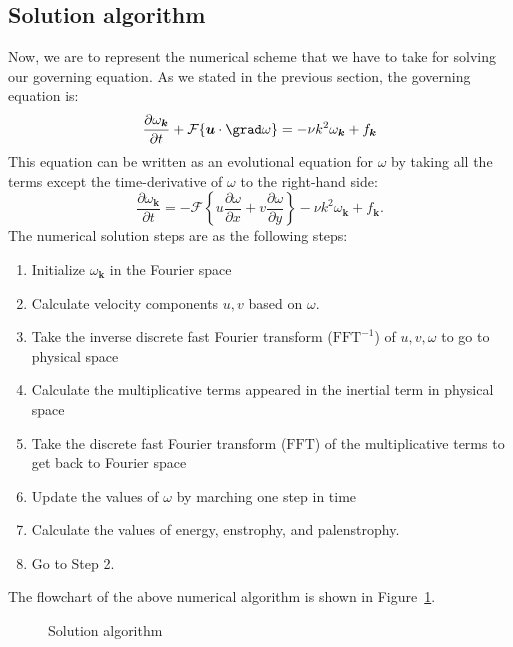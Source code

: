 \documentclass[12pt]{article}
\def\vk{\bm{k}}
\def\u{\bm{u}}
\begin{document}
\subsection{Solution algorithm}
Now, we are to represent the numerical scheme that we have to take for solving our governing equation. As we stated in the previous section, the governing equation is:
\begin{equation}\label{Eq-14}
\frac{\partial\omega_{\vk}}{\partial t} + \mathcal{F}\{\u\cdot\grad\omega\}= -\nu{k}^2\omega_{\vk} + f_{\vk}
\end{equation}
%
This equation can be written as an evolutional equation for $\omega$ by taking all the terms except the time-derivative of $\omega$ to the right-hand side:
\begin{equation}\label{Eq-15}
\frac{\partial\omega_{\vk}}{\partial t} =- \mathcal{F}\left\lbrace u\dfrac{\partial \omega}{\partial x}+v\dfrac{\partial \omega}{\partial y}\right\rbrace -\nu{k}^2\omega_{\vk} + f_{\vk}.
\end{equation}
%
The numerical solution steps are as the following steps:
\begin{enumerate}
\item Initialize $\omega_{\vk}$ in the Fourier space
\item Calculate velocity components $u,v$ based on $\omega$.
\item Take the inverse discrete fast Fourier transform ($\text{FFT}^{-1}$) of $u,v,\omega$ to go to physical space
\item Calculate the multiplicative terms appeared in the inertial term in physical space
\item Take the discrete fast Fourier transform ($\text{FFT}$) of the multiplicative terms to get back to Fourier space
\item Update the values of $\omega$ by marching one step in time
\item Calculate the values of energy, enstrophy, and palenstrophy.
\item Go to Step 2.
\end{enumerate}
The flowchart of the above numerical algorithm is shown in Figure~\ref{algorithm}.
\begin{figure}[ht]
\begin{center}
\caption{Solution algorithm}\label{algorithm}
\end{center}
\end{figure}
\end{document}
